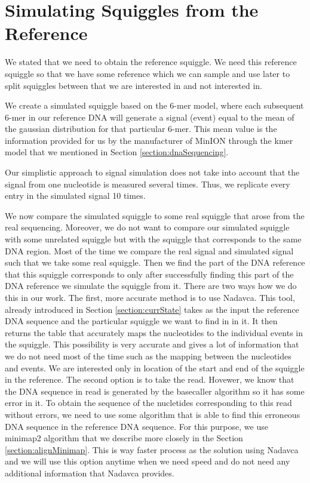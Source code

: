 \section{Simulating Squiggles from the Reference}

We stated that we need to obtain the reference squiggle. We need this reference squiggle
so that we have some reference which we can sample and use later to split squiggles
between that we are interested in and not interested in.

We create a simulated squiggle based on the 6-mer model,
where each subsequent 6-mer in our reference DNA will generate a signal (event) equal to
the mean of the gaussian distribution for that particular 6-mer. This mean value
is the information provided for us by the manufacturer of MinION through the kmer model
that we mentioned in Section \ref{section:dnaSequencing}.

Our simplistic approach to signal simulation does not take into account that the
signal from one nucleotide is measured several times. Thus, we replicate every entry in the simulated signal
10 times.

We now compare the simulated squiggle to some real squiggle that arose from the real
sequencing. Moreover, we do not want to compare our simulated squiggle with some unrelated squiggle
but with the squiggle that corresponds to the same DNA region. Most of the time we
compare the real signal and simulated signal such that we take some real squiggle.
Then we find the part of the DNA reference that this squiggle corresponds to only
after successfully finding this part of the DNA reference we simulate
the squiggle from it. There are two
ways how we do this in our work. The first, more accurate method is to
use Nadavca. This tool, already introduced in Section \ref{section:currState} takes
as the input the reference DNA sequence and the particular squiggle we want to find in
in it. It then returns the table that accurately maps the nucleotides to the individual
events in the squiggle. This possibility is very accurate and gives a lot of information
that we do not need most of the time such as the mapping between the nucleotides
and events. We are interested only in location of the start and end of the squiggle
in the reference. The second option is to take the read.
Hovewer, we know that the DNA sequence in read is generated by the basecaller algorithm so it has some error
in it. To obtain the sequence of the nucletides corresponding to this read without
errors, we need to use some algorithm that is able to find this erroneous DNA
sequence in the reference DNA sequence. For this purpose, we use minimap2 algorithm
that we describe more closely in the Section \ref{section:alignMinimap}. This is way faster
process as the solution using Nadavca and we will use this option anytime when we need
speed and do not need any additional information that Nadavca provides.

